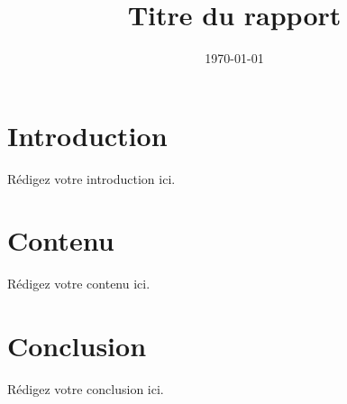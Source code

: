 \documentclass{report}
\title{Titre du rapport}
\author{}
\date{\today}
\begin{document}
\maketitle

\chapter{Introduction}
Rédigez votre introduction ici.

\chapter{Contenu}
Rédigez votre contenu ici.

\chapter{Conclusion}
Rédigez votre conclusion ici.
\end{document}
